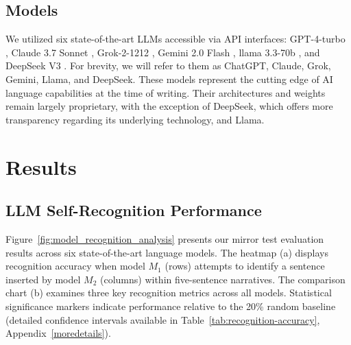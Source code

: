 \documentclass{article}
\begin{document}
\subsection{Models}

We utilized six state-of-the-art LLMs accessible via API interfaces: GPT-4-turbo \citep{openai2024gpt45}, Claude 3.7 Sonnet \citep{anthropic2025claude}, Grok-2-1212 \citep{xai2024grok}, Gemini 2.0 Flash \citep{geminiteam2024gemini}, llama 3.3-70b \citep{llama2024llm}, and DeepSeek V3 \citep{deepseek2024llm}. For brevity, we will refer to them as ChatGPT, Claude, Grok, Gemini, Llama, and DeepSeek. These models represent the cutting edge of AI language capabilities at the time of writing. Their architectures and weights remain largely proprietary, with the exception of DeepSeek, which offers more transparency regarding its underlying technology, and Llama.

\section{Results}
\subsection{LLM Self-Recognition Performance}

Figure~\ref{fig:model_recognition_analysis} presents our mirror test evaluation results across six state-of-the-art language models. The heatmap (a) displays recognition accuracy when model $M_1$ (rows) attempts to identify a sentence inserted by model $M_2$ (columns) within five-sentence narratives. The comparison chart (b) examines three key recognition metrics across all models. Statistical significance markers indicate performance relative to the 20\% random baseline (detailed confidence intervals available in Table~\ref{tab:recognition-accuracy}, Appendix~\ref{moredetails}).
\end{document}
